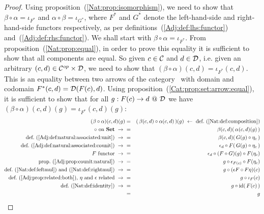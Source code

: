 \begin{proof}
    Using proposition~(\ref{Nat:prop:isomorphism}), we need to show that 
    $\beta\circ\alpha=\iota_{F^{*}}$ and $\alpha\circ\beta
    =\iota_{G^{*}}$, where $F^{*}$ and $G^{*}$ denote the left-hand-side 
    and right-hand-side functors respectively, as per 
    definitions~(\ref{Adj:def:lhs:functor}) and~(\ref{Adj:def:rhs:functor}).
    We shall start with $\beta\circ\alpha=\iota_{F^{*}}$. From
    proposition~(\ref{Nat:prop:equal}), in order to prove this equality it 
    is sufficient to show that all components are equal. So given
    $c\in\mbox{$\cal C$}$ and $d\in\mbox{$\cal D$}$, i.e. given an arbitrary $(c,d)\in\mbox{${\cal C}^{op}$}\times\mbox{$\cal D$}$,
    we need to show that $(\beta\circ\alpha)(c,d)=\iota_{F^{*}}(c,d)$.
    This is an equality between two arrows of the category \Set\ with
    domain and codomain $F^{*}(c,d)=\mbox{$\cal D$}(F(c),d)$. Using 
    proposition~(\ref{Cat:prop:set:arrow:equal}), it is sufficient to show
    that for all $g:F(c)\to d\ @\ \mbox{$\cal D$}$ we have $(\beta\circ\alpha)(c,d)(g)=
    \iota_{F^{*}}(c,d)(g)$:
        \begin{eqnarray*}(\beta\circ\alpha)(c,d)(g)
            &=&(\,\beta(c,d)\circ\alpha(c,d)\,)(g)
            \ \leftarrow\ \mbox{def.~(\ref{Nat:def:composition})}\\
            \mbox{$\circ$ on \Set}\ \to\ 
            &=&\beta(c,d)(\,\alpha(c,d)(g)\,)\\
            \mbox{def.~(\ref{Adj:def:natural:associated:unit})}\ \to\ 
            &=&\beta(c,d)(\,G(g)\circ\eta_{c}\,)\\
            \mbox{def.~(\ref{Adj:def:natural:associated:counit})}\ \to\ 
            &=&\epsilon_{d}\circ F(\,G(g)\circ\eta_{c}\,)\\
            \mbox{$F$ functor}\ \to\ 
            &=&\epsilon_{d}\circ (F\circ G)(g)\circ F(\eta_{c})\\
            \mbox{prop.~(\ref{Adj:prop:counit:natural})}\ \to\ 
            &=&g\circ\epsilon_{F(c)}\circ F(\eta_{c})\\
            \mbox{def.~(\ref{Nat:def:leftmul}) and~(\ref{Nat:def:rightmul})}\ \to\ 
            &=&g\circ(\epsilon F\circ F\eta)(c)\\
            \mbox{def.~(\ref{Adj:prop:related:both}), $\eta$ and 
            $\epsilon$ related}\ \to\ 
            &=&g\circ\iota_{F}(c)\\
            \mbox{def.~(\ref{Nat:def:identity})}\ \to\ 
            &=&g\circ\id(\,F(c)\,)\\
            &=&g\\

\end{eqnarray*}
\end{proof}

